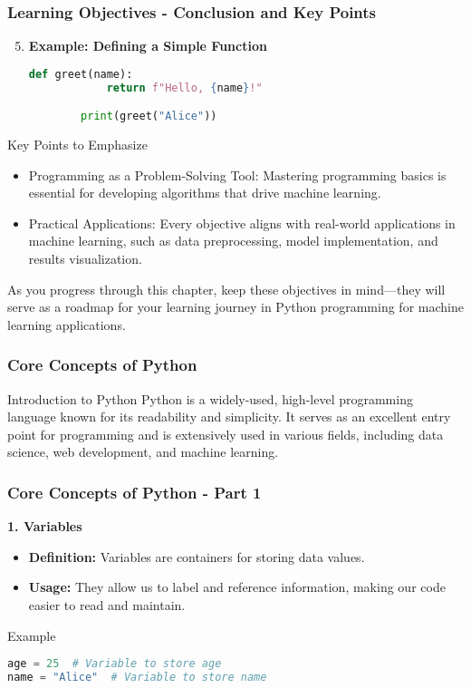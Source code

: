 \documentclass{beamer}
\begin{document}
\begin{frame}[fragile]
    \frametitle{Learning Objectives - Conclusion and Key Points}
    \begin{enumerate}
        \setcounter{enumi}{4} %
        \item \textbf{Example: Defining a Simple Function}
        \begin{lstlisting}[language=Python]
        def greet(name):
            return f"Hello, {name}!"

        print(greet("Alice"))
        \end{lstlisting}
    \end{enumerate}
    
    \begin{block}{Key Points to Emphasize}
        \begin{itemize}
            \item Programming as a Problem-Solving Tool: Mastering programming basics is essential for developing algorithms that drive machine learning.
            \item Practical Applications: Every objective aligns with real-world applications in machine learning, such as data preprocessing, model implementation, and results visualization.
        \end{itemize}
    \end{block}
    
    As you progress through this chapter, keep these objectives in mind—they will serve as a roadmap for your learning journey in Python programming for machine learning applications.
\end{frame}

\begin{frame}
    \frametitle{Core Concepts of Python}
    \begin{block}{Introduction to Python}
        Python is a widely-used, high-level programming language known for its readability and simplicity.
        It serves as an excellent entry point for programming and is extensively used in various fields,
        including data science, web development, and machine learning.
    \end{block}
\end{frame}

\begin{frame}[fragile]
    \frametitle{Core Concepts of Python - Part 1}
    \textbf{1. Variables}
    \begin{itemize}
        \item \textbf{Definition:} Variables are containers for storing data values.
        \item \textbf{Usage:} They allow us to label and reference information, making our code easier to read and maintain.
    \end{itemize}
    
    \begin{block}{Example}
    \begin{lstlisting}[language=Python]
age = 25  # Variable to store age
name = "Alice"  # Variable to store name
    \end{lstlisting}
    \end{block}
\end{frame}
\end{document}
